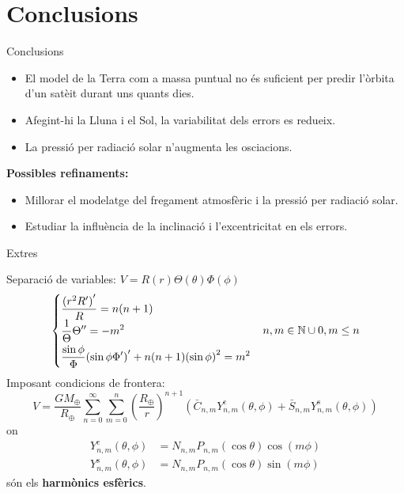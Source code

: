 \documentclass{beamer} %
\begin{document}
\section{Conclusions}
\begin{frame}{Conclusions}
  \begin{itemize}
    \item El model de la Terra com a massa puntual no és suficient per predir l'òrbita d'un satè\lgem it durant uns quants dies.
    \item Afegint-hi la Lluna i el Sol, la variabilitat dels errors es redueix.
    \item La pressió per radiació solar n'augmenta les osci\lgem acions.
  \end{itemize}
  \vspace{0.5cm}\pause
  \textbf{Possibles refinaments:}
  \begin{itemize}
    \item Millorar el modelatge del fregament atmosfèric i la pressió per radiació solar.
    \item Estudiar la influència de la inclinació i l'excentricitat en els errors.
  \end{itemize}
\end{frame}
\begin{frame}{Extres}

\end{frame}
\begin{frame}
  Separació de variables: $V=R(r)\Theta(\theta)\Phi(\phi)$
  \begin{gather*}
    \begin{cases}
      \displaystyle\frac{{(r^2R')}'}{R}=n(n+1)                  \\
      \displaystyle\frac{1}{\Theta}\Theta'' =-m^2\vspace{0.1cm} \\
      \displaystyle\frac{\sin\phi}{\Phi}{(\sin\phi\Phi')}'+n(n+1){(\sin\phi)}^2 =m^2
    \end{cases}\!n,m\in\NN\cup{0}, m\leq n
  \end{gather*}\pause
  Imposant condicions de frontera:
  \begin{equation*}
    V =\frac{GM_\oplus}{R_\oplus}\sum_{n=0}^\infty \sum_{m=0}^n{\left(\frac{{R_\oplus}}{r}\right)}^{n+1}(\bar{C}_{n,m}Y_{n,m}^{\mathrm{c}}(\theta,\phi)+\bar{S}_{n,m}Y_{n,m}^{\mathrm{s}}(\theta,\phi))
  \end{equation*}
  on
  \begin{align*}
    Y_{n,m}^{\mathrm{c}}(\theta,\phi) & =N_{n,m}P_{n,m}(\cos\theta)\cos(m\phi) \\
    Y_{n,m}^{\mathrm{s}}(\theta,\phi) & =N_{n,m}P_{n,m}(\cos\theta)\sin(m\phi)
  \end{align*}
  són els \textbf{harmònics esfèrics}.
\end{frame}
\end{document}
